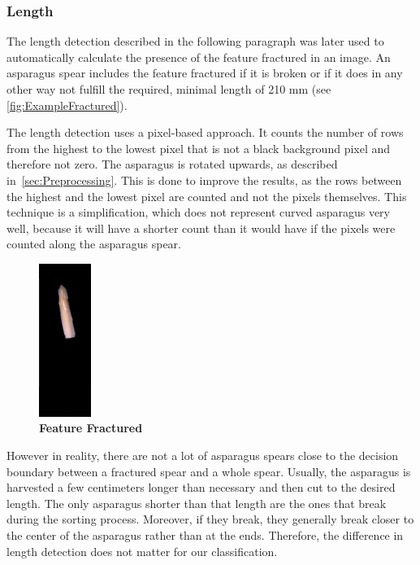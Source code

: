\subsubsection{Length}
\label{subsec:Length}

The length detection described in the following paragraph was later used to automatically calculate the presence of the feature fractured in an image. An asparagus spear includes the feature fractured if it is broken or if it does in any other way not fulfill the required, minimal length of 210 mm (see \autoref{fig:ExampleFractured}). 

\bigskip
The length detection uses a pixel-based approach. It counts the number of rows from the highest to the lowest pixel that is not a black background pixel and therefore not zero. The asparagus is rotated upwards, as described in~\autoref{sec:Preprocessing}. This is done to improve the results, as the rows between the highest and the lowest pixel are counted and not the pixels themselves. This technique is a simplification, which does not represent curved asparagus very well, because it will have a shorter count than it would have if the pixels were counted along the asparagus spear.

\begin{figure}
  \begin{center}
    \includegraphics[width=0.15\textwidth]{Figures/chapter03/example_img_fractured.png}
  \end{center}
  \vspace{-15pt}
  \caption[Example Image Feature Fractured]{ \textbf{Feature Fractured}}
  \label{fig:ExampleFractured}
\end{figure}

However in reality, there are not a lot of asparagus spears close to the decision boundary between a fractured spear and a whole spear. Usually, the asparagus is harvested a few centimeters longer than necessary and then cut to the desired length. The only asparagus shorter than that length are the ones that break during the sorting process. Moreover, if they break, they generally break closer to the center of the asparagus rather than at the ends. Therefore, the difference in length detection does not matter for our classification.

